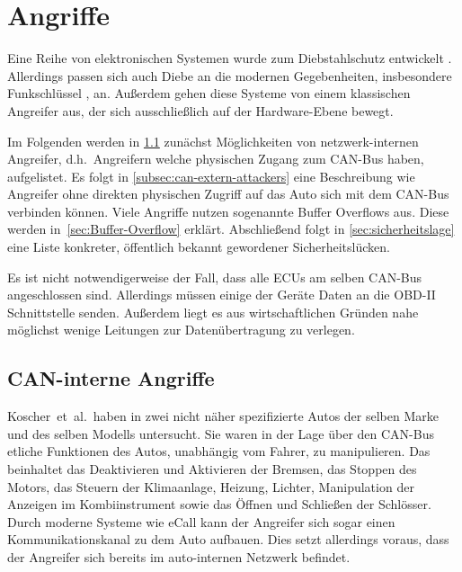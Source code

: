 \section{Angriffe}\label{ch:attack}

Eine Reihe von elektronischen Systemen wurde zum Diebstahlschutz entwickelt
\cite{Song2008,Turner1999,Hwang1997}. Allerdings passen sich auch Diebe an die
modernen Gegebenheiten, insbesondere Funk\-schlüssel \cite{Lee2014}, an. Außerdem
gehen diese Systeme von einem klassischen Angreifer aus, der sich
ausschließlich auf der Hardware-Ebene bewegt.

Im Folgenden werden in \cref{subsec:can-intern-attackers} zunächst
Möglichkeiten von netzwerk-internen Angreifer, d.h.~Angreifern welche
physischen Zugang zum CAN-Bus haben, aufgelistet. Es folgt in
\cref{subsec:can-extern-attackers} eine Beschreibung wie Angreifer ohne
direkten physischen Zugriff auf das Auto sich mit dem CAN-Bus verbinden können.
Viele Angriffe nutzen sogenannte Buffer Overflows aus. Diese werden
in~\cref{sec:Buffer-Overflow} erklärt. Abschließend folgt in
\cref{sec:sicherheitslage} eine Liste konkreter, öffentlich bekannt gewordener
Sicherheitslücken.

Es ist nicht notwendigerweise der Fall, dass alle ECUs am selben CAN-Bus
angeschlossen sind. Allerdings müssen einige der Geräte Daten an die OBD-II
Schnittstelle senden. Außerdem liegt es aus wirtschaftlichen Gründen nahe
möglichst wenige Leitungen zur Datenübertragung zu verlegen.


\subsection{CAN-interne Angriffe}\label{subsec:can-intern-attackers}
Koscher~et~al.~haben in \cite{Koscher2010} zwei nicht näher spezifizierte Autos
der selben Marke und des selben Modells untersucht. Sie waren in der Lage über
den CAN-Bus etliche Funktionen des Autos, unabhängig vom Fahrer, zu
manipulieren. Das beinhaltet das Deaktivieren und Aktivieren der Bremsen, das
Stoppen des Motors, das Steuern der Klimaanlage, Heizung, Lichter, Manipulation
der Anzeigen im Kombiinstrument sowie das Öffnen und Schließen der Schlösser.
Durch moderne Systeme wie eCall kann der Angreifer sich sogar einen
Kommunikationskanal zu dem Auto aufbauen. Dies setzt allerdings voraus, dass
der Angreifer sich bereits im auto-internen Netzwerk befindet.

%
%
%


